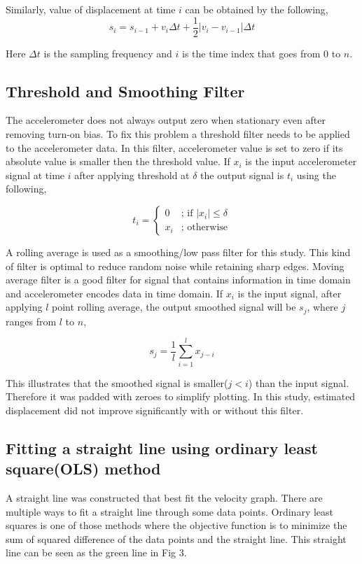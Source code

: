 \documentclass{article}
\begin{document}
Similarly, value of displacement at time $i$ can be obtained by the following,
$$s_i = s_{i-1} + v_i \Delta t + \frac{1}{2}|v_i - v_{i-1}| \Delta t$$

Here $\Delta t$ is the sampling frequency and $i$ is the time index that goes from $0$ to $n$.

\subsection{Threshold and Smoothing Filter}
The accelerometer does not always output zero when stationary even after removing turn-on bias. To fix this problem a threshold filter needs to be applied to the accelerometer data. In this filter, accelerometer value is set to zero if its absolute value is smaller then the threshold value. If $x_i$ is the input accelerometer signal at time $i$ after applying threshold at $\delta$ the output signal is $t_i$ using the following,

\begin{equation}
  t_i =
    \begin{cases}
      0 & \text{; if }|x_i| \le \delta \nonumber \\
      x_i & \text{; otherwise} 
    \end{cases}       
\end{equation}

A rolling average is used as a smoothing/low pass filter for this study. This kind of filter is optimal to reduce random noise while retaining sharp edges. Moving average filter is a good filter for signal that contains information in time domain and accelerometer encodes data in time domain\cite{smith2013digital}. If $x_i$ is the input signal, after applying $l$ point rolling average, the output smoothed signal will be $s_j$, where $j$ ranges from $l$ to $n$,

$$s_j = \frac{1}{l} \sum_{i=1}^l x_{j-i}$$

This illustrates that the smoothed signal is smaller($j < i$) than the input signal. Therefore it was padded with zeroes to simplify plotting. In this study, estimated displacement did not improve significantly with or without this filter.

\subsection{Fitting a straight line using ordinary least square(OLS) method}
A straight line was constructed that best fit the velocity graph. There are multiple ways to fit a straight line through some data points. Ordinary least squares is one of those methods where the objective function is to minimize the sum of squared difference of the data points and the straight line. This straight line can be seen as the green line in Fig 3.
\end{document}
